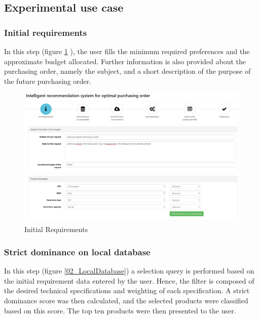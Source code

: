 \documentclass[preprint,3p,onecolumn]{elsarticle}
\begin{document}
\subsection{Experimental use case}
\subsubsection{Initial requirements}
\par In this step (figure \ref{01_Initial_requirements} ), the user fills the minimum required preferences and the approximate budget allocated. Further information is also provided about the purchasing order, namely the subject, and a short description of the purpose of the future purchasing order. 

\begin{figure}[H]
\centering
\includegraphics[scale=.3]{01_Initial_requirements}
\caption{Initial Requirements}
\label{01_Initial_requirements}
\end{figure}

\subsubsection{Strict dominance on local database}
\par In this step (figure \ref{02_LocalDatabase}) a selection query is performed based on the initial requirement data entered by the user. Hence, the filter is composed of the desired technical specifications and weighting of each specification. A strict dominance score was then calculated, and the selected products were classified based on this score. The top ten products were then presented to the user.
\end{document}
